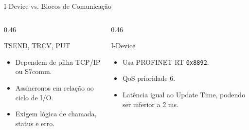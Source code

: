 \documentclass[10pt, aspectratio=169]{beamer}
\begin{document}
\begin{frame}{I-Device vs. Blocos de Comunica\c{c}\~ao}
    \small
    \begin{columns}[T,totalwidth=\textwidth]
        \begin{column}{0.46\textwidth}
            \begin{block}{TSEND, TRCV, PUT}
                \begin{itemize}
                    \item Dependem de pilha TCP/IP ou S7comm.
                    \item Ass\'incronos em rela\c{c}\~ao ao ciclo de I/O.
                    \item Exigem l\'ogica de chamada, status e erro.
                \end{itemize}
            \end{block}
        \end{column}
        \begin{column}{0.46\textwidth}
            \begin{block}{I-Device}
                \begin{itemize}
                    \item Usa \alert{PROFINET RT \texttt{0x8892}}.
                    \item QoS prioridade 6.
                    \item Lat\^encia igual ao Update Time, podendo ser inferior a 2 ms.
                \end{itemize}
            \end{block}
        \end{column}
    \end{columns}
\end{frame}
\end{document}
